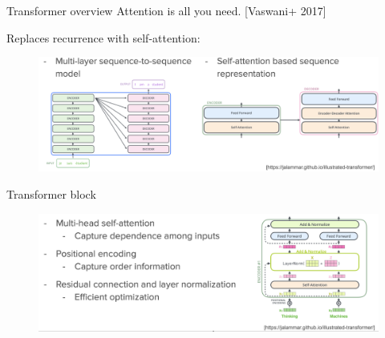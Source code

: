 \documentclass[usenames,dvipsnames,11pt,aspectratio=169]{beamer}
\begin{document}
\begin{frame}
    {Transformer overview}
    Attention is all you need. [Vaswani+ 2017]

    Replaces recurrence with self-attention:\\
    \begin{figure}
        \includegraphics[width=\textwidth]{figures/transformer-high-level}
    \end{figure}

\end{frame}

\begin{frame}
    {Transformer block}
    \begin{figure}
        \includegraphics[width=\textwidth]{figures/transformer-block}
    \end{figure}
\end{frame}
\end{document}
